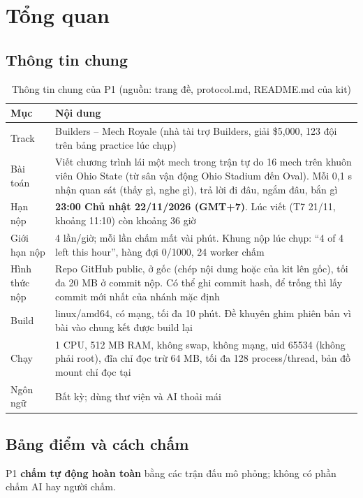 \documentclass[a4paper,12pt]{article}
\newcommand{\src}[1]{{\footnotesize\textcolor{p7}{(nguồn: #1)}}}
\newcommand{\fn}[1]{\texttt{\detokenize{#1}}}
\begin{document}
\thispagestyle{fancy}
\newpage
\tableofcontents
\newpage

\sloppy

\section{Tổng quan}

\subsection{Thông tin chung}
\begin{table}[H]
\centering\small
\begin{tabularx}{\textwidth}{L{4.0cm}Y}
\toprule
\textbf{Mục} & \textbf{Nội dung} \\
\midrule
Track & Builders -- Mech Royale (nhà tài trợ Builders, giải \$5{,}000, 123 đội trên bảng practice lúc chụp) \\
Bài toán & Viết chương trình lái một mech trong trận tự do 16 mech trên khuôn viên Ohio State (từ sân vận động Ohio Stadium đến Oval). Mỗi 0,1 s nhận quan sát (thấy gì, nghe gì), trả lời đi đâu, ngắm đâu, bắn gì \\
Hạn nộp & \textbf{23:00 Chủ nhật 22/11/2026 (GMT+7)}. Lúc viết (T7 21/11, khoảng 11:10) còn khoảng 36 giờ \\
Giới hạn nộp & 4 lần/giờ; mỗi lần chấm mất vài phút. Khung nộp lúc chụp: ``4 of 4 left this hour'', hàng đợi 0/1000, 24 worker chấm \\
Hình thức nộp & Repo GitHub public, \fn{Dockerfile} ở gốc (chép nội dung \fn{python/} hoặc \fn{ts/} của kit lên gốc), tối đa 20 MB ở commit nộp. Có thể ghi commit hash, để trống thì lấy commit mới nhất của nhánh mặc định \\
Build & linux/amd64, có mạng, tối đa 10 phút. Đề khuyên ghim phiên bản vì bài vào chung kết được build lại \\
Chạy & 1 CPU, 512 MB RAM, không swap, không mạng, uid 65534 (không phải root), đĩa chỉ đọc trừ \fn{/tmp} 64 MB, tối đa 128 process/thread, bản đồ mount chỉ đọc tại \fn{/arena} \\
Ngôn ngữ & Bất kỳ; dùng thư viện và AI thoải mái \\
\bottomrule
\end{tabularx}
\caption{Thông tin chung của P1 \src{trang đề, protocol.md, README.md của kit}}
\end{table}

\subsection{Bảng điểm và cách chấm}
P1 \textbf{chấm tự động hoàn toàn} bằng các trận đấu mô phỏng; không có phần chấm AI hay người chấm.
\end{document}
